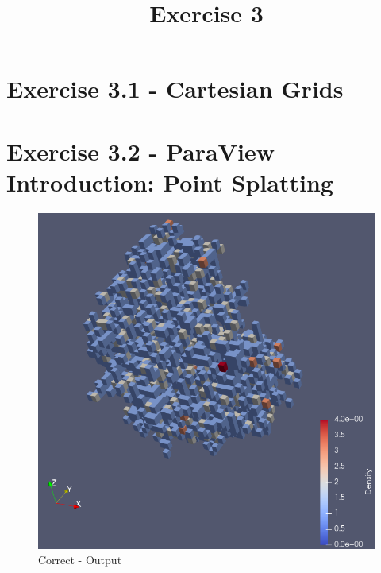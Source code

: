 \documentclass[a4paper]{article}
\date{}
\author{}
\title{Exercise 3}
\begin{document}
	
	\maketitle
	\thispagestyle{fancy}
	
	\section*{Exercise 3.1 - Cartesian Grids}
	
	
	\section*{Exercise 3.2 - ParaView Introduction: Point Splatting}
	
	\begin{figure}[!ht]
		\centering
		\includegraphics[width=0.7\linewidth]{paraview}
		\caption{Correct - Output}
		\label{fig:paraview}
	\end{figure}
	
	
	
\end{document}
